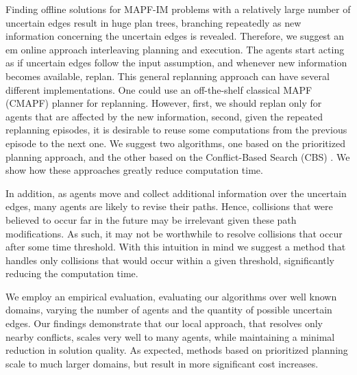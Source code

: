\documentclass[letterpaper]{article} %
\def\
UrlFont{\rm}  %
\newcommand{\plan}[1]{\textbf{[\color{blue}PLAN:#1]}}
\theoremstyle{definition}
\begin{document}
Finding offline solutions for MAPF-IM problems with a relatively large number of uncertain edges result in huge plan trees, branching repeatedly as new information concerning the uncertain edges is revealed. Therefore, we suggest an {em online} approach interleaving planning and execution. The agents start acting as if  uncertain edges follow the input assumption, and whenever new information becomes available, replan.
This general replanning approach can have several different implementations. One could use an off-the-shelf classical MAPF (CMAPF) planner for replanning. However, first, we should replan only for agents that are affected by the new information, second, given the repeated replanning episodes, it is desirable to reuse some computations from the previous episode to the next one. We suggest two algorithms, one based on the prioritized planning \cite{silver2005cooperative} approach, and the other based on the Conflict-Based Search (CBS) \cite{sharon2015conflict}. We show how these approaches greatly reduce computation time.

In addition, as agents move and collect additional information over the uncertain edges, many agents are likely to revise their paths. Hence, collisions that were believed to occur far in the future may be irrelevant given these path modifications. As such, it may not be worthwhile to resolve collisions that occur after some time threshold. With this intuition in mind we suggest a method that handles only collisions that would occur within a given threshold, significantly reducing the computation time.

We employ an empirical evaluation, evaluating our algorithms over well known domains, varying the number of agents and the quantity of possible uncertain edges.
Our findings demonstrate that our local approach, that resolves only nearby conflicts, scales very well to many agents, while maintaining a minimal reduction in solution quality. As expected, methods based on prioritized planning scale to much larger domains, but result in more significant cost increases.







\end{document}
